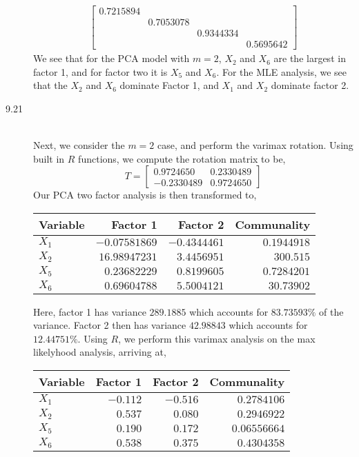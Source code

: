 \documentclass[letterpaper,10pt]{article}
\begin{document}
\begin{description}
\begin{align*}
\begin{bmatrix}
0.7215894\\
& 0.7053078\\
&& 0.9344334\\
&&& 0.5695642
\end{bmatrix}
\end{align*}
We see that for the PCA model with $m=2$, $X_2$ and $X_6$ are the largest in factor 1, and for factor two it is $X_5$ and $X_6$. For the MLE analysis, we see that the $X_2$ and $X_6$ dominate Factor 1, and $X_1$ and $X_2$ dominate factor 2.
\item[9.21]\hfill\\
Next, we consider the $m=2$ case, and perform the varimax rotation. Using built in $R$ functions, we compute the rotation matrix to be,
\[T=\begin{bmatrix}
0.9724650 & 0.2330489\\
-0.2330489 & 0.9724650
\end{bmatrix} \]
Our PCA two factor analysis is then transformed to,
\begin{center}
\begin{tabular}{|l|r|r|r|}
\hline
Variable & Factor 1 & Factor 2 & Communality\\\hline
$X_1$ & $ -0.07581869 $ & $ -0.4344461 $ & $ 0.1944918 $\\
$X_2$ & $ 16.98947231 $ & $ 3.4456951 $ & $ 300.515 $\\
$X_5$ & $ 0.23682229 $ & $ 0.8199605 $ & $ 0.7284201 $\\
$X_6$ & $ 0.69604788 $ & $ 5.5004121 $ & $ 30.73902 $\\\hline
\end{tabular}
\end{center}
Here, factor 1 has variance $289.1885$ which accounts for $83.73593\%$ of the variance. Factor 2 then has variance $42.98843$ which accounts for $12.44751\%$. Using $R$, we perform this varimax analysis on the max likelyhood analysis, arriving at,
\begin{center}
\begin{tabular}{|l|r|r|r|}
\hline
Variable & Factor 1 & Factor 2 & Communality\\\hline
$X_1$ & $ -0.112 $ & $ -0.516 $ & $ 0.2784106 $\\
$X_2$ & $ 0.537 $ & $ 0.080 $ & $ 0.2946922 $\\
$X_5$ & $ 0.190 $ & $ 0.172 $ & $ 0.06556664 $\\
$X_6$ & $ 0.538 $ & $ 0.375 $ & $ 0.4304358 $\\\hline
\end{tabular}

\end{center}
\end{description}
\end{document}
